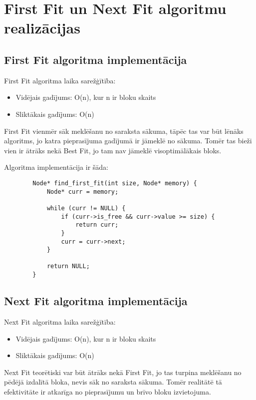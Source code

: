 \documentclass{report}
\begin{document}
	\section{First Fit un Next Fit algoritmu realizācijas}
	
	\subsection{First Fit algoritma implementācija}
	
	First Fit algoritma laika sarežģītība:
	\begin{itemize}
		\item Vidējais gadījums: O(n), kur n ir bloku skaits
		\item Sliktākais gadījums: O(n)
	\end{itemize}
	
	First Fit vienmēr sāk meklēšanu no saraksta sākuma, tāpēc tas var būt lēnāks algoritms, jo katra pieprasījuma gadījumā ir jāmeklē no sākuma. Tomēr tas bieži vien ir ātrāks nekā Best Fit, jo tam nav jāmeklē visoptimālākais bloks.
	
	Algoritma implementācija ir šāda:
	
	\begin{verbatim}
		Node* find_first_fit(int size, Node* memory) {
			Node* curr = memory;
			
			while (curr != NULL) {
				if (curr->is_free && curr->value >= size) {
					return curr;
				}
				curr = curr->next;
			}
			
			return NULL; 
		}
	\end{verbatim}
	
	\subsection{Next Fit algoritma implementācija}
	
	Next Fit algoritma laika sarežģītība:
	\begin{itemize}
		\item Vidējais gadījums: O(n), kur n ir bloku skaits
		\item Sliktākais gadījums: O(n)
	\end{itemize}
	
	Next Fit teorētiski var būt ātrāks nekā First Fit, jo tas turpina meklēšanu no pēdējā izdalītā bloka, nevis sāk no saraksta sākuma. Tomēr realitātē tā efektivitāte ir atkarīga no pieprasījumu un brīvo bloku izvietojuma.
	
\end{document}
